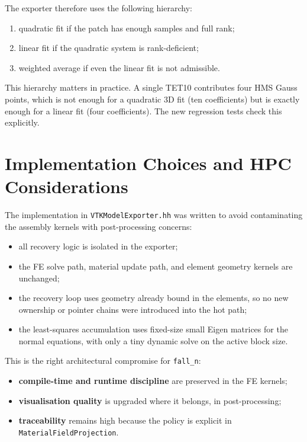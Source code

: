 The exporter therefore uses the following hierarchy:
\begin{enumerate}[nosep]
  \item quadratic fit if the patch has enough samples and full rank;
  \item linear fit if the quadratic system is rank-deficient;
  \item weighted average if even the linear fit is not admissible.
\end{enumerate}

This hierarchy matters in practice.  A single TET10 contributes four HMS Gauss
points, which is not enough for a quadratic 3D fit (ten coefficients) but is
exactly enough for a linear fit (four coefficients).  The new regression tests
check this explicitly.


\section{Implementation Choices and HPC Considerations}
\label{sec:patch_hpc}

The implementation in \texttt{VTKModelExporter.hh} was written to avoid
contaminating the assembly kernels with post-processing concerns:
\begin{itemize}[nosep]
  \item all recovery logic is isolated in the exporter;
  \item the FE solve path, material update path, and element geometry kernels
        are unchanged;
  \item the recovery loop uses geometry already bound in the elements, so no
        new ownership or pointer chains were introduced into the hot path;
  \item the least-squares accumulation uses fixed-size small Eigen matrices for
        the normal equations, with only a tiny dynamic solve on the active
        block size.
\end{itemize}

This is the right architectural compromise for \texttt{fall\_n}:
\begin{itemize}[nosep]
  \item \textbf{compile-time and runtime discipline} are preserved in the FE
        kernels;
  \item \textbf{visualisation quality} is upgraded where it belongs, in
        post-processing;
  \item \textbf{traceability} remains high because the policy is explicit in
        \texttt{MaterialFieldProjection}.
\end{itemize}


